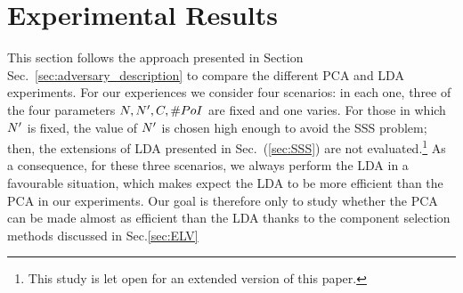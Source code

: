 \section{Experimental Results}\label{sec:experiments}
This section follows the approach presented in Section Sec.~\ref{sec:adversary_description} to compare the different PCA and LDA experiments. For our experiences we consider four scenarios: in each one, three of the four parameters $\numTraces[], \numTraces[]', \newTraceLength, \numPoI$ are fixed and one varies. For those in which $\numTraces[]'$ is fixed, the value of $\numTraces[]'$ is chosen high enough to avoid the SSS problem; then, the extensions of LDA presented in Sec.~(\ref{sec:SSS}) are not evaluated.\footnote{This study is let open for an extended version of this paper.} As a consequence, for these three scenarios, we always perform the LDA in a favourable situation, which makes expect the LDA to be more efficient than the PCA in our experiments. Our goal is therefore only to study whether the PCA can be made almost as efficient than the LDA thanks to the component selection methods discussed in Sec.\ref{sec:ELV}

